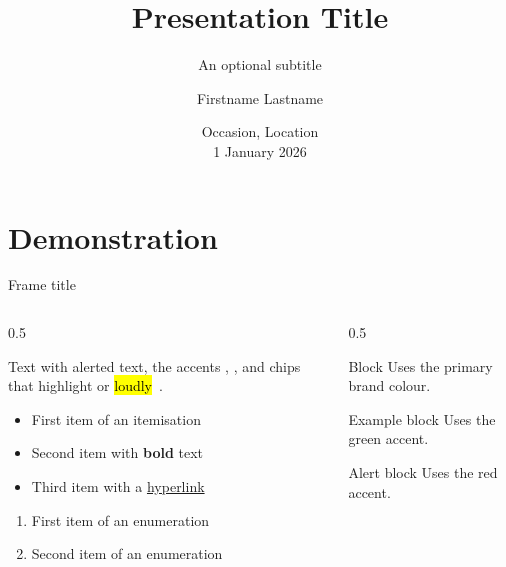 \documentclass[11pt,aspectratio=169,t]{beamer}
\title{Presentation Title}
\subtitle{An optional subtitle}
\author{Firstname Lastname}
\institute{
  PyPSA Labs \\
  \href{mailto:name@pypsalabs.org}{name@pypsalabs.org}
}
\date{\alert{Occasion, Location} \\ 1 January 2026}
\begin{document}
\begin{frame}[plain]
  \titlepage
\end{frame}
\addtocounter{framenumber}{-1}

\section{Demonstration}

\begin{frame}{Frame title}

  \begin{columns}[T]
    \begin{column}{0.5\textwidth}

      Text with \alert{alerted text}, the accents , ,
       and chips that highlight  or
      \hl{loudly}~\cite{PyPSA}.

      \begin{itemize}
        \item First item of an itemisation
        \item Second item with \textbf{bold} text
        \item Third item with a \href{https://pypsa.org}{hyperlink}
      \end{itemize}

      \begin{enumerate}
        \item First item of an enumeration
        \item Second item of an enumeration
      \end{enumerate}

    \end{column}
    \begin{column}{0.5\textwidth}

      \begin{block}{Block}
        Uses the primary brand colour.
      \end{block}

      \begin{exampleblock}{Example block}
        Uses the green accent.
      \end{exampleblock}

      \begin{alertblock}{Alert block}
        Uses the red accent.
      \end{alertblock}

    \end{column}
  \end{columns}

\end{frame}
\end{document}
